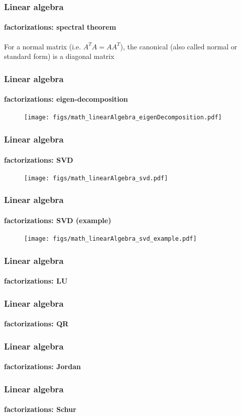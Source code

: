 \begin{frame}
\frametitle{Linear algebra}
\framesubtitle{factorizations: spectral theorem}
\logoCSIPCPL\mypagenum\mypagenum
	For a normal matrix (i.e. $A^TA=AA^T$), the canonical (also called normal or standard form) is a diagonal matrix
\end{frame}




\begin{frame}
\frametitle{Linear algebra}
\framesubtitle{factorizations: eigen-decomposition}
\logoCSIPCPL\mypagenum\mypagenum
	\begin{figure}
		\texttt{[image: figs/math\_linearAlgebra\_eigenDecomposition.pdf]}
	\end{figure}
\end{frame}

\begin{frame}
\frametitle{Linear algebra}
\framesubtitle{factorizations: SVD}
\logoCSIPCPL\mypagenum\mypagenum
	\begin{figure}
		\texttt{[image: figs/math\_linearAlgebra\_svd.pdf]}
	\end{figure}
\end{frame}


\begin{frame}
\frametitle{Linear algebra}
\framesubtitle{factorizations: SVD (example)}
\logoCSIPCPL\mypagenum\mypagenum
	\begin{figure}
		\texttt{[image: figs/math\_linearAlgebra\_svd\_example.pdf]}
	\end{figure}
\end{frame}


\begin{frame}
\frametitle{Linear algebra}
\framesubtitle{factorizations: LU}
\logoCSIPCPL\mypagenum\mypagenum
\end{frame}

\begin{frame}
\frametitle{Linear algebra}
\framesubtitle{factorizations: QR}
\logoCSIPCPL\mypagenum\mypagenum
\end{frame}






\begin{frame}
\frametitle{Linear algebra}
\framesubtitle{factorizations: Jordan}
\logoCSIPCPL\mypagenum\mypagenum
\end{frame}


\begin{frame}
\frametitle{Linear algebra}
\framesubtitle{factorizations: Schur}
\logoCSIPCPL\mypagenum\mypagenum
\end{frame}




